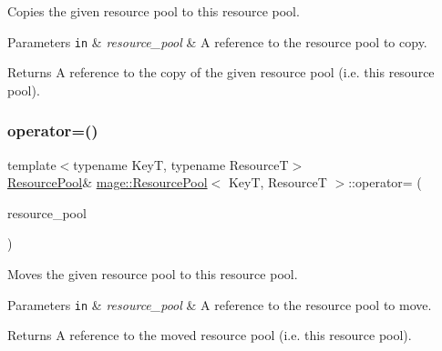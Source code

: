 Copies the given resource pool to this resource pool.


\begin{DoxyParams}[1]{Parameters}
\mbox{\tt in}  & {\em resource\+\_\+pool} & A reference to the resource pool to copy. \\
\hline
\end{DoxyParams}
\begin{DoxyReturn}{Returns}
A reference to the copy of the given resource pool (i.\+e. this resource pool). 
\end{DoxyReturn}
\hypertarget{classmage_1_1_resource_pool_a1c0c196460508108435c227c11a65b94}{}\label{classmage_1_1_resource_pool_a1c0c196460508108435c227c11a65b94} 
\subsubsection{\texorpdfstring{operator=()}{operator=()}\hspace{0.1cm}{\footnotesize\ttfamily [2/2]}}
{\footnotesize\ttfamily template$<$typename KeyT, typename ResourceT$>$ \\
\hyperlink{classmage_1_1_resource_pool}{Resource\+Pool}\& \hyperlink{classmage_1_1_resource_pool}{mage\+::\+Resource\+Pool}$<$ KeyT, ResourceT $>$\+::operator= (\begin{DoxyParamCaption}\item[{\hyperlink{classmage_1_1_resource_pool}{Resource\+Pool}$<$ KeyT, ResourceT $>$ \&\&}]{resource\+\_\+pool }\end{DoxyParamCaption})\hspace{0.3cm}{\ttfamily [delete]}}

Moves the given resource pool to this resource pool.


\begin{DoxyParams}[1]{Parameters}
\mbox{\tt in}  & {\em resource\+\_\+pool} & A reference to the resource pool to move. \\
\hline
\end{DoxyParams}
\begin{DoxyReturn}{Returns}
A reference to the moved resource pool (i.\+e. this resource pool). 
\end{DoxyReturn}
\hypertarget{classmage_1_1_resource_pool_a83a33e15bd8f326d0ebc11b3f8e52a41}{}\label{classmage_1_1_resource_pool_a83a33e15bd8f326d0ebc11b3f8e52a41} 
